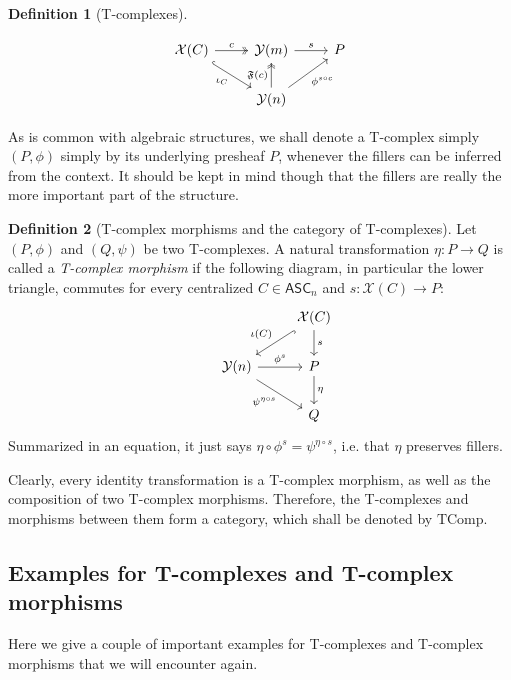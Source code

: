 \documentclass{article}
\theoremstyle{remark}
\theoremstyle{definition}
\newtheorem{definition}{Definition}[subsection]
\newcommand{\ASC}{\mathsf{ASC}}
\newcommand{\Y}{\mathcal Y}
\newcommand{\X}{\mathcal X}
\newcommand{\F}{\mathfrak F}
\newcommand{\TComp}{\mathrm{TComp}}
\begin{document}
\begin{definition}[T-complexes]
\begin{enumerate}
			\begin{equation}\label{epifac}\begin{tikzcd}
				\X(C)\arrow[two heads]{r}{c}\arrow[hook]{dr}[swap]{\iota_C}&\Y(m)\arrow{r}{s}&P\\
				&\Y(n)\arrow[two heads]{u}{\F(c)}\arrow{ur}[swap]{\phi^{s\circ c}}
			\end{tikzcd}\end{equation}
		\end{enumerate}
		As is common with algebraic structures, we shall denote a T-complex simply $(P,\phi)$ simply by its underlying presheaf $P$, whenever the fillers can be inferred from the context. It should be kept in mind though that the fillers are really the more important part of the structure.
	\end{definition}
	\begin{definition}[T-complex morphisms and the category of T-complexes]
		Let $(P,\phi)$ and $(Q,\psi)$ be two T-complexes. A natural transformation $\eta:P\to Q$ is called a \textit{T-complex morphism} if the following diagram, in particular the lower triangle, commutes for every centralized $C\in\ASC_n$ and $s:\X(C)\to P$:
		\[\begin{tikzcd}
			&&\X(C)\arrow{d}{s}\arrow[hook]{ld}[swap]{\iota(C)}\\
			&\Y(n)\arrow{r}{\phi^s}\arrow{dr}[swap]{\psi^{\eta\circ s}}&P\arrow{d}{\eta}\\
			&&Q
		\end{tikzcd}\]
		Summarized in an equation, it just says $\eta\circ\phi^s=\psi^{\eta\circ s}$, i.e. that $\eta$ preserves fillers.
		
		Clearly, every identity transformation is a T-complex morphism, as well as the composition of two T-complex morphisms. Therefore, the T-complexes and morphisms between them form a category, which shall be denoted by $\TComp$.
	\end{definition}
	\subsection{Examples for T-complexes and T-complex morphisms}
	Here we give a couple of important examples for T-complexes and T-complex morphisms that we will encounter again.
	
\end{document}
